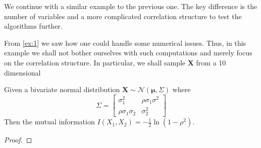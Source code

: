 \documentclass[../Thesis.tex]{subfiles}
\begin{document}
We continue with a similar example to the previous one. The key difference is the number of variables and a more complicated correlation structure to test the algorithms further.
\begin{example}
    From \autoref{ex:1} we saw how one could handle some numerical issues. Thus, in this example we shall not bother ourselves with such computations and merely focus on the correlation structure. In particular, we shall sample $\boldsymbol X$ from a 10 dimensional
\end{example}


\newpage
\begin{proposition} \label{prop:MI bivariate gaussian}
    Given a bivariate normal distribution $\boldsymbol X \sim \mathcal{N}\left(\boldsymbol \mu,  \Sigma\right)$ where
    $$\Sigma =
        \begin{bmatrix}
            \sigma_1^2             & \rho \sigma_1 \sigma^2 \\
            \rho \sigma_1 \sigma_2 & \sigma_2^2
        \end{bmatrix}
    $$
    Then the mutual information $I\left(X_1, X_2\right) = -\frac{1}{2}\ln \left(1 - \rho^2\right)$.
\end{proposition}
\begin{proof}

\end{proof}
\end{document}
